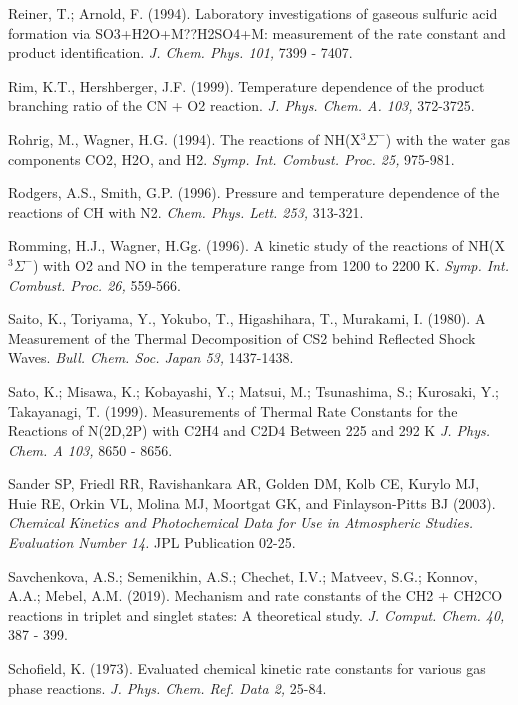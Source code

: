 \documentclass[12pt,landscape]{article}
\newcounter{reaction}
\begin{document}
Reiner, T.; Arnold, F. (1994).  Laboratory investigations of gaseous sulfuric acid formation via SO3+H2O+M??H2SO4+M: measurement of the rate constant and product identification. {\em J. Chem. Phys. 101,} 7399 - 7407.

Rim, K.T., Hershberger, J.F. (1999).  Temperature dependence of the product branching ratio of the CN + O2 reaction. {\em J. Phys. Chem. A. 103,}  372-3725.

Rohrig, M., Wagner, H.G. (1994). The reactions of NH(X$^3\Sigma^-$) with the water gas components CO2, H2O, and H2.  {\em Symp. Int. Combust. Proc.  25,} 975-981.

Rodgers, A.S., Smith, G.P. (1996). Pressure and temperature dependence of the reactions of CH with N2. {\em Chem. Phys. Lett. 253,} 313-321.

Romming, H.J., Wagner, H.Gg. (1996). A kinetic study of the reactions of NH(X$^3\Sigma^-$) with O2 and NO in the temperature range from 1200 to 2200 K.  {\em Symp. Int. Combust. Proc. 26,} 559-566.

Saito, K., Toriyama, Y., Yokubo, T., Higashihara, T., Murakami, I. (1980). A Measurement of the Thermal Decomposition of CS2 behind Reflected Shock Waves. {\em Bull. Chem. Soc. Japan 53,} 1437-1438.

Sato, K.; Misawa, K.; Kobayashi, Y.; Matsui, M.; Tsunashima, S.; Kurosaki, Y.; Takayanagi, T. (1999).
Measurements of Thermal Rate Constants for the Reactions of N(2D,2P) with C2H4 and C2D4 Between 225 and 292 K
{\em  J. Phys. Chem. A 103,}  8650 - 8656.

Sander SP, Friedl RR,  Ravishankara AR, Golden DM, Kolb CE, Kurylo MJ, Huie RE, Orkin VL, Molina MJ, Moortgat GK, and Finlayson-Pitts BJ (2003).
{\em Chemical Kinetics and Photochemical Data for Use in Atmospheric Studies. Evaluation Number 14.} JPL Publication 02-25.

Savchenkova, A.S.; Semenikhin, A.S.; Chechet, I.V.; Matveev, S.G.; Konnov, A.A.; Mebel, A.M. (2019).
Mechanism and rate constants of the CH2 + CH2CO reactions in triplet and singlet states: A theoretical study.
{\em J. Comput. Chem. 40,} 387 - 399.

Schofield, K.  (1973).  Evaluated chemical kinetic rate constants for various gas phase reactions.  {\em J. Phys. Chem. Ref. Data 2,} 25-84.
\end{document}
